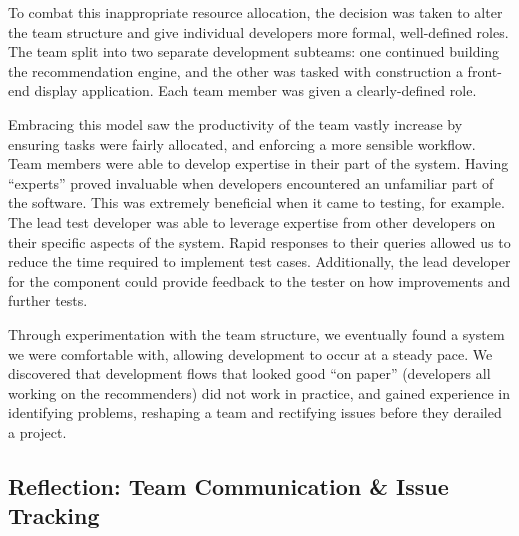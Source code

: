 \documentclass{l3proj}
\begin{document}
To combat this inappropriate resource allocation, the decision was taken to alter the team structure and give individual developers more formal, well-defined roles. The team split into two separate development subteams: one continued building the recommendation engine, and the other was tasked with construction a front-end display application. Each team member was given a clearly-defined role. 

Embracing this model saw the productivity of the team vastly increase by ensuring tasks were fairly allocated, and enforcing a more sensible workflow. Team members were able to develop expertise in their part of the system. Having “experts” proved invaluable when developers encountered an unfamiliar part of the software. This was extremely beneficial when it came to testing, for example. The lead test developer was able to leverage expertise from other developers on their specific aspects of the system. Rapid responses to their queries allowed us to reduce the time required to implement test cases. Additionally, the lead developer for the component could provide feedback to the tester on how improvements and further tests.

Through experimentation with the team structure, we eventually found a system we were comfortable with, allowing development to occur at a steady pace. We discovered that development flows that looked good “on paper” (developers all working on the recommenders) did not work in practice, and gained experience in identifying problems, reshaping a team and rectifying issues before they derailed a project. 

\subsection{Reflection: Team Communication \& Issue Tracking}
\label{sec:communication}


\end{document}
